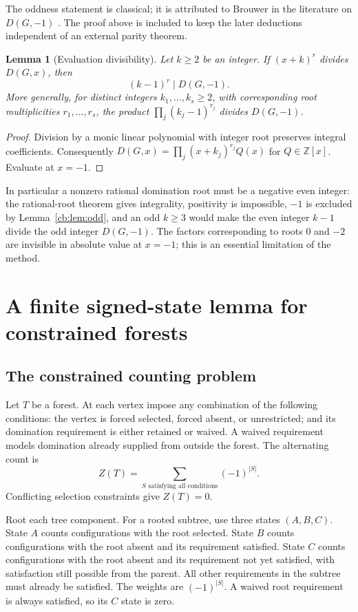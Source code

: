 \documentclass[11pt]{article}
\numberwithin{equation}{section}
\newtheorem{lemma}[theorem]{Lemma}
\theoremstyle{definition}
\newcommand{\Z}{\mathbb{Z}}
\begin{document}
The oddness statement is classical; it is attributed to Brouwer in the
literature on $D(G,-1)$ \cite{AlikhaniMinusOne}. The proof above is included
to keep the later deductions independent of an external parity theorem.

\begin{lemma}[Evaluation divisibility]\label{cb:lem:divisibility}
Let $k\ge2$ be an integer. If $(x+k)^r$ divides $D(G,x)$, then
\[
 (k-1)^r\mid D(G,-1).
\]
More generally, for distinct integers $k_1,\ldots,k_s\ge2$, with corresponding
root multiplicities $r_1,\ldots,r_s$, the product
$\prod_j(k_j-1)^{r_j}$ divides $D(G,-1)$.
\end{lemma}
\begin{proof}
Division by a monic linear polynomial with integer root preserves integral
coefficients. Consequently
$D(G,x)=\prod_j(x+k_j)^{r_j}Q(x)$ for $Q\in\Z[x]$. Evaluate at $x=-1$.
\end{proof}

In particular a nonzero rational domination root must be a negative even
integer: the rational-root theorem gives integrality, positivity is
impossible, $-1$ is excluded by Lemma~\ref{cb:lem:odd}, and an odd $k\ge3$
would make the even integer $k-1$ divide the odd integer $D(G,-1)$.
The factors corresponding to roots $0$ and $-2$ are invisible in absolute
value at $x=-1$; this is an essential limitation of the method.

\section{A finite signed-state lemma for constrained forests}\label{cb:sec:forest}

\subsection{The constrained counting problem}
Let $T$ be a forest. At each vertex impose any combination of the following
conditions: the vertex is forced selected, forced absent, or unrestricted;
and its domination requirement is either retained or waived. A waived
requirement models domination already supplied from outside the forest.
The alternating count is
\begin{equation}\label{cb:eq:constrained}
 Z(T)=\sum_{S\text{ satisfying all conditions}}(-1)^{|S|}.
\end{equation}
Conflicting selection constraints give $Z(T)=0$.

Root each tree component. For a rooted subtree, use three states $(A,B,C)$.
State $A$ counts configurations with the root selected. State $B$ counts
configurations with the root absent and its requirement satisfied. State
$C$ counts configurations with the root absent and its requirement not yet
satisfied, with satisfaction still possible from the parent. All other
requirements in the subtree must already be satisfied. The weights are
$(-1)^{|S|}$. A waived root requirement is always satisfied, so its $C$ state
is zero.
\end{document}
